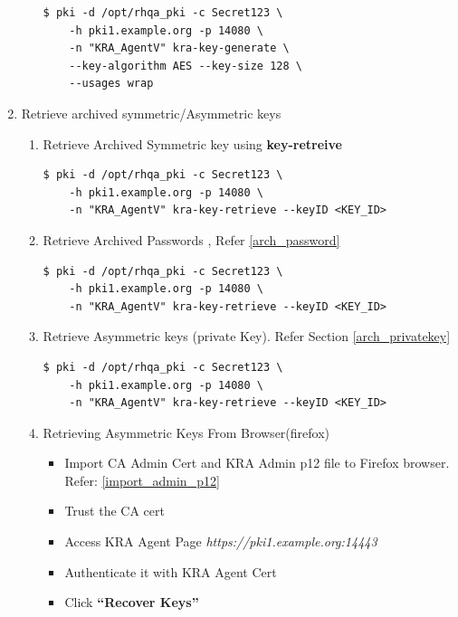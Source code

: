 \documentclass[12pt]{report}
\begin{document}
\begin{enumerate}[label*=\arabic*.]
\begin{enumerate}[label*=\arabic*.]
                    \begin{lstlisting}[style=bashInputStyle]
$ pki -d /opt/rhqa_pki -c Secret123 \
    -h pki1.example.org -p 14080 \
    -n "KRA_AgentV" kra-key-generate \
    --key-algorithm AES --key-size 128 \
    --usages wrap 
                    \end{lstlisting}
            \end{enumerate}
        \item  Retrieve archived symmetric/Asymmetric keys 
            \begin{enumerate}[label*=\arabic*.]
                \item Retrieve Archived Symmetric key using \textbf{key-retreive}
                    \begin{lstlisting}[style=bashInputStyle]
$ pki -d /opt/rhqa_pki -c Secret123 \
    -h pki1.example.org -p 14080 \
    -n "KRA_AgentV" kra-key-retrieve --keyID <KEY_ID>
                    \end{lstlisting}
                \item Retrieve Archived Passwords , Refer \ref{arch_password}
                    \begin{lstlisting}[style=bashInputStyle]
$ pki -d /opt/rhqa_pki -c Secret123 \
    -h pki1.example.org -p 14080 \
    -n "KRA_AgentV" kra-key-retrieve --keyID <KEY_ID>
                    \end{lstlisting}
                \item Retrieve Asymmetric keys (private Key). Refer Section \ref{arch_privatekey}
                    \begin{lstlisting}[style=bashInputStyle]
$ pki -d /opt/rhqa_pki -c Secret123 \
    -h pki1.example.org -p 14080 \
    -n "KRA_AgentV" kra-key-retrieve --keyID <KEY_ID>
                    \end{lstlisting}
                \item Retrieving Asymmetric Keys From Browser(firefox)
                    \begin{itemize}
                        \item Import CA Admin Cert and KRA Admin p12 file to Firefox browser. Refer: \ref{import_admin_p12}
                        \item Trust the CA cert 
                        \item Access KRA Agent Page \textit{https://pki1.example.org:14443}
                        \item Authenticate it with KRA Agent Cert
                        \item Click \textbf{``Recover Keys''}

\end{itemize}
\end{enumerate}
\end{enumerate}
\end{document}
